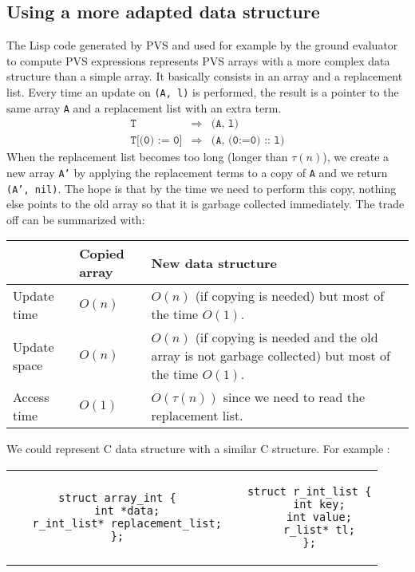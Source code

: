 \documentclass[12pt,a4paper]{article}
\newcommand{\cl}[1]{\texttt{#1}}
\begin{document}
\subsection{Using a more adapted data structure}

The Lisp code generated by PVS and used for example by the ground evaluator to compute PVS expressions represents PVS arrays with a more complex data structure than a simple array. It basically consists in an array and a replacement list. Every time an update on \cl{(A, l)} is performed, the result is a pointer to the same array \cl{A} and a replacement list with an extra term.
\begin{eqnarray}
\cl{T} &\Longrightarrow& \cl{(A, l)} \\
\cl{T[(0) := 0]}&\Longrightarrow& \cl{(A, (0:=0) :: l)}
\end{eqnarray}
When the replacement list becomes too long (longer than $\tau(n)$), we create a new array \cl{A'} by applying the replacement terms to a copy of \cl{A} and we return \cl{(A', nil)}. The hope is that by the time we need to perform this copy, nothing else points to the old array so that it is garbage collected immediately. The trade off can be summarized with:

\begin{center}
\begin{tabular}{|l|l|p{10cm}|}
\hline
 & Copied array & New data structure \\ \hline
Update time & $O(n)$ & $O(n)$ (if copying is needed) but most of the time $O(1)$.  \\ \hline
Update space & $O(n)$ & $O(n)$ (if copying is needed and the old array is not garbage collected) but most of the time $O(1)$. \\ \hline
Access time & $O(1)$ & $O(\tau(n))$ since we need to read the replacement list. \\ \hline
\end{tabular}
\end{center}

We could represent C data structure with a similar C structure. For example :
\begin{center}
\begin{tabular}{ccc}
\begin{lstlisting}
struct array_int {
   int *data;
   r_int_list* replacement_list;
};
\end{lstlisting}
&  \hspace{2cm} &
\begin{lstlisting}
struct r_int_list {
   int key;
   int value;
   r_list* tl;
};
\end{lstlisting}
\end{tabular}
\end{center}
\end{document}
